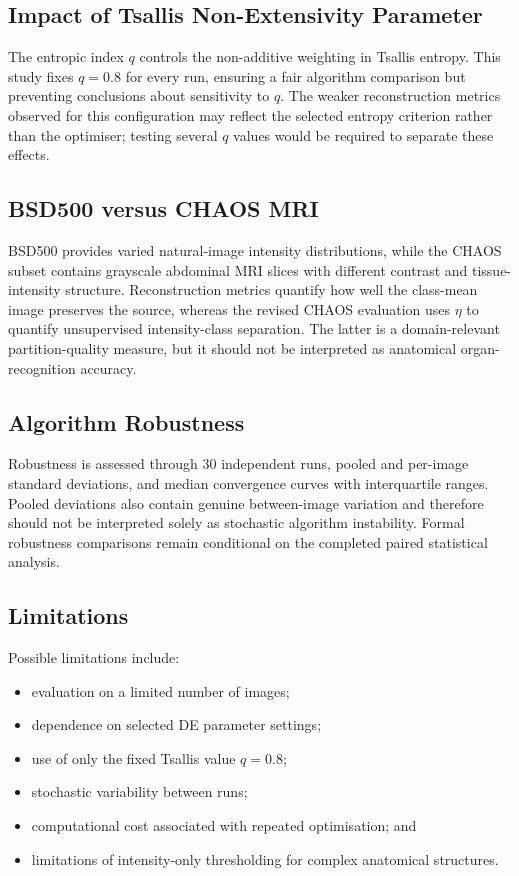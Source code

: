\documentclass[review,authoryear]{elsarticle}
\begin{document}
\subsection{Impact of Tsallis Non-Extensivity Parameter}

The entropic index $q$ controls the non-additive weighting in Tsallis
entropy. This study fixes $q=0.8$ for every run, ensuring a fair
algorithm comparison but preventing conclusions about sensitivity to
$q$. The weaker reconstruction metrics observed for this configuration
may reflect the selected entropy criterion rather than the optimiser;
testing several $q$ values would be required to separate these effects.


\subsection{BSD500 versus CHAOS MRI}

BSD500 provides varied natural-image intensity distributions, while the
CHAOS subset contains grayscale abdominal MRI slices with different
contrast and tissue-intensity structure. Reconstruction metrics quantify
how well the class-mean image preserves the source, whereas the revised
CHAOS evaluation uses $\eta$ to quantify unsupervised intensity-class
separation. The latter is a domain-relevant partition-quality measure, but
it should not be interpreted as anatomical organ-recognition accuracy.


\subsection{Algorithm Robustness}

Robustness is assessed through 30 independent runs, pooled and per-image
standard deviations, and median convergence curves with interquartile
ranges. Pooled deviations also contain genuine between-image variation
and therefore should not be interpreted solely as stochastic algorithm
instability. Formal robustness comparisons remain conditional on the
completed paired statistical analysis.


\subsection{Limitations}

Possible limitations include:

\begin{itemize}
    \item evaluation on a limited number of images;
    \item dependence on selected DE parameter settings;
    \item use of only the fixed Tsallis value $q=0.8$;
    \item stochastic variability between runs;
    \item computational cost associated with repeated optimisation; and
    \item limitations of intensity-only thresholding for complex
          anatomical structures.
\end{itemize}
\end{document}
